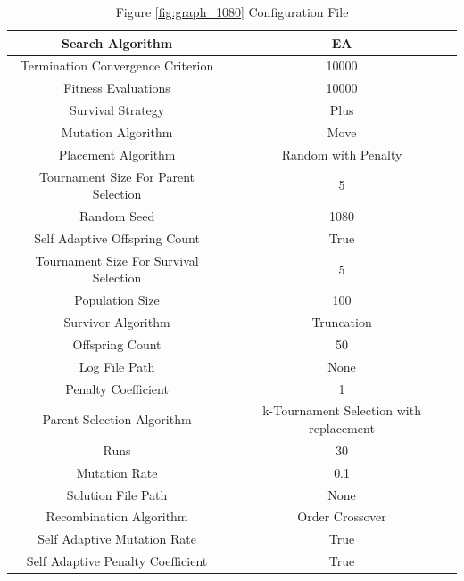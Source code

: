 \documentclass{standalone}
\begin{document}
\begin{table}[!htb]
	\centering
	\caption{Figure \ref{fig:graph_1080} Configuration File}
	\label{tab:graph_1080}
	\begin{tabular}{| c | c |}
		\hline
		Search Algorithm		& EA		 \\
		\hline
		Termination Convergence Criterion		& 10000		 \\
		\hline
		Fitness Evaluations		& 10000		 \\
		\hline
		Survival Strategy		& Plus		 \\
		\hline
		Mutation Algorithm		& Move		 \\
		\hline
		Placement Algorithm		& Random with Penalty		 \\
		\hline
		Tournament Size For Parent Selection		& 5		 \\
		\hline
		Random Seed		& 1080		 \\
		\hline
		Self Adaptive Offspring Count		& True		 \\
		\hline
		Tournament Size For Survival Selection		& 5		 \\
		\hline
		Population Size		& 100		 \\
		\hline
		Survivor Algorithm		& Truncation		 \\
		\hline
		Offspring Count		& 50		 \\
		\hline
		Log File Path		& None		 \\
		\hline
		Penalty Coefficient		& 1		 \\
		\hline
		Parent Selection Algorithm		& k-Tournament Selection with replacement		 \\
		\hline
		Runs		& 30		 \\
		\hline
		Mutation Rate		& 0.1		 \\
		\hline
		Solution File Path		& None		 \\
		\hline
		Recombination Algorithm		& Order Crossover		 \\
		\hline
		Self Adaptive Mutation Rate		& True		 \\
		\hline
		Self Adaptive Penalty Coefficient		& True		 \\
		\hline
	\end{tabular}
\end{table}
\end{document}
